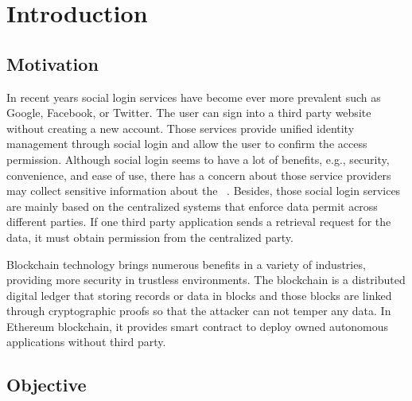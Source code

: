 \chapter{Introduction}
\label{chapter:intro}
\section{Motivation}
In recent years social login services have become ever more prevalent such as Google, Facebook, or Twitter. The user can sign into a third party website without creating a new account. Those services provide unified identity management through social login and allow the user to confirm the access permission. Although social login seems to have a lot of benefits, e.g., security, convenience, and ease of use, there has a concern about those service providers may collect sensitive information about the ~\cite{gafni2014social}.
Besides, those social login services are mainly based on the centralized systems that enforce data permit across different parties. If one third party application sends a retrieval request for the data, it must obtain permission from the centralized party.\par
Blockchain technology brings numerous benefits in a variety of industries, providing more security in trustless environments. The blockchain is a distributed digital ledger that storing records or data in blocks and those blocks are linked through cryptographic proofs so that the attacker can not temper any data. In Ethereum blockchain, it provides smart contract to deploy owned autonomous applications without third party.

\section{Objective}